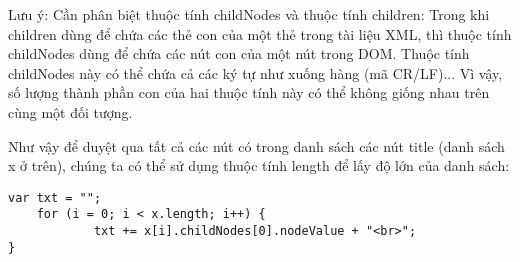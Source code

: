 Lưu ý: Cần phân biệt thuộc tính {\ttfamily childNodes} và thuộc tính {\ttfamily children}: Trong khi {\ttfamily children} dùng để chứa các thẻ con của một thẻ trong tài liệu XML, thì thuộc tính {\ttfamily childNodes} dùng để chứa các nút con của một nút trong DOM. Thuộc tính {\ttfamily childNodes} này có thể chứa cả các ký tự như xuống hàng (mã CR/LF)... Vì vậy, số lượng thành phần con của hai thuộc tính này có thể không giống nhau trên cùng một đối tượng.

Như vậy để duyệt qua tất cả các nút có trong danh sách các nút {\ttfamily title} (danh sách {\ttfamily x} ở trên), chúng ta có thể sử dụng thuộc tính {\ttfamily length} để lấy độ lớn của danh sách:
\lstset{language=XML}
\begin{lstlisting}[escapechar=`]
	var txt = "";
	for (i = 0; i < x.length; i++) { 
	        txt += x[i].childNodes[0].nodeValue + "<br>";
}
\end{lstlisting}
